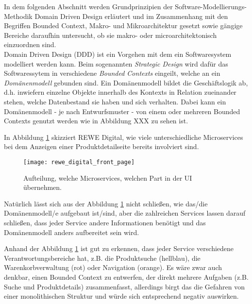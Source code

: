 In dem folgenden Abschnitt werden Grundprinzipien der Software-Modellierungs-Methodik Domain Driven Design erläutert und im Zusammenhang mit den Begriffen Bounded Context, Makro- und Mikroarchitektur gesetzt sowie gängige Bereiche daraufhin untersucht, ob sie makro- oder microarchitektonisch einzuordnen sind.\\





Domain Driven Design (DDD) ist ein Vorgehen mit dem ein Softwaresystem modelliert werden kann. \cite{heise2016ddd} Beim sogenannten \textit{Strategic Design} wird dafür das Softwaressytem in verschiedene \textit{Bounded Contexts} eingeilt, welche an ein \textit{Domänenmodell} gebunden sind. Ein Domänenmodell bildet die Geschäftslogik ab, d.h. inwiefern einzelne Objekte innerhalb des Kontexts in Relation zueinander stehen, welche Datenbestand sie haben und sich verhalten. Dabei kann ein Domänenmodell - je nach Entwurfsmuster - von einem oder mehreren Bounded Contexts genutzt werden wie in Abbildung XXX zu sehen ist.\cite{wolff2018mic_praxis}  




In Abbildung \ref{fig:rewe_microservice_ui} skizziert REWE Digital, wie viele unterschiedliche Microservices bei dem Anzeigen einer Produktdetailseite bereits involviert sind. \\ 

\begin{figure}[ht]
	\centering
	\texttt{[image: rewe\_digital\_front\_page]}
	\caption{Aufteilung, welche Microservices, welchen Part in der UI übernehmen.\cite{rewe2019mic_ppp}}
	\label{fig:rewe_microservice_ui}
\end{figure}

Natürlich lässt sich aus der Abbildung \ref{fig:rewe_microservice_ui} nicht schließen, wie das/die Domänenmodell/e aufgebaut ist/sind, aber die zahlreichen Services lassen darauf schließen, dass jeder Service andere Informationen benötigt und das Domänenmodell anders aufbereitet sein wird. 

Anhand der Abbildung \ref{fig:rewe_microservice_ui} ist gut zu erkennen, dass jeder Service verschiedene Verantwortungsbereiche hat, z.B. die Produktsuche (hellblau), die Warenkorbverwaltung (rot) oder Navigation (orange). Es wäre zwar auch denkbar, einen Bounded Context zu entwerfen, der direkt mehrere Aufgaben (z.B. Suche und Produktdetails) zusammenfasst, allerdings birgt das die Gefahren von einer monolithischen Struktur und würde sich entsprechend negativ auswirken.\cite{wolff2018mic_praxis} \\

